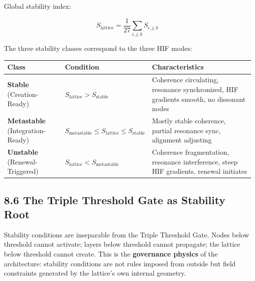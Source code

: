 Global stability index:

\[
S_{\text{lattice}} = \frac{1}{27} \sum_{i,j,k} S_{i,j,k}
\]

The three stability classes correspond to the three HIF modes:

{\def\LTcaptype{none} %
\begin{longtable}[]{@{}
  >{\raggedright\arraybackslash}p{}
  >{\raggedright\arraybackslash}p{}
  >{\raggedright\arraybackslash}p{}@{}}
\toprule\noalign{}
\begin{minipage}[b]{\linewidth}\raggedright
Class
\end{minipage} & \begin{minipage}[b]{\linewidth}\raggedright
Condition
\end{minipage} & \begin{minipage}[b]{\linewidth}\raggedright
Characteristics
\end{minipage} \\
\midrule\noalign{}
\endhead
\bottomrule\noalign{}
\endlastfoot
\textbf{Stable} (Creation-Ready) & \(S_{\text{lattice}} > S_{\text{stable}}\) & Coherence circulating, resonance synchronized, HIF gradients smooth, no dissonant nodes \\
\textbf{Metastable} (Integration-Ready) & \(S_{\text{metastable}} \le S_{\text{lattice}} \le S_{\text{stable}}\) & Mostly stable coherence, partial resonance sync, alignment adjusting \\
\textbf{Unstable} (Renewal-Triggered) & \(S_{\text{lattice}} < S_{\text{metastable}}\) & Coherence fragmentation, resonance interference, steep HIF gradients, renewal initiates \\
\end{longtable}
}

\subsection{8.6 The Triple Threshold Gate as Stability Root}\label{the-triple-threshold-gate-as-stability-root}

Stability conditions are inseparable from the Triple Threshold Gate. Nodes below threshold cannot activate; layers below threshold cannot propagate; the lattice below threshold cannot create. This is the \textbf{governance physics} of the architecture: stability conditions are not rules imposed from outside but field constraints generated by the lattice's own internal geometry.

